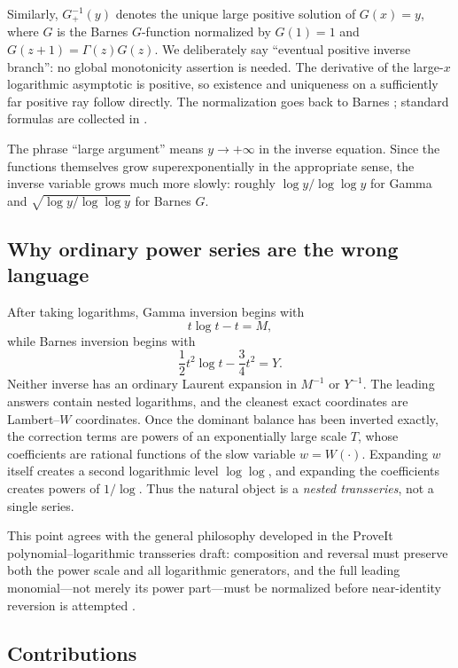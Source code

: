 \documentclass[11pt]{article}
\theoremstyle{definition}
\theoremstyle{remark}
\newcommand{\Barinv}{G_{+}^{-1}}
\begin{document}
Similarly, \(\Barinv(y)\) denotes the unique large positive solution of
\(G(x)=y\), where \(G\) is the Barnes \(G\)-function normalized by
\(G(1)=1\) and \(G(z+1)=\Gamma(z)G(z)\).  We deliberately say
``eventual positive inverse branch'': no global monotonicity assertion is needed.  The derivative of the large-\(x\) logarithmic asymptotic is positive, so existence and uniqueness on a sufficiently far positive ray follow directly.  The normalization goes back to Barnes \cite{Barnes1900}; standard formulas are collected in \cite{DLMF}.

The phrase ``large argument'' means \(y\to+\infty\) in the inverse equation.  Since the functions themselves grow superexponentially in the appropriate sense, the inverse variable grows much more slowly: roughly \(\log y/\log\log y\) for Gamma and \(\sqrt{\log y/\log\log y}\) for Barnes \(G\).

\subsection{Why ordinary power series are the wrong language}

After taking logarithms, Gamma inversion begins with
\[
  t\log t-t=M,
\]
while Barnes inversion begins with
\[
  \frac12t^2\log t-\frac34t^2=Y.
\]
Neither inverse has an ordinary Laurent expansion in \(M^{-1}\) or \(Y^{-1}\).  The leading answers contain nested logarithms, and the cleanest exact coordinates are Lambert--\(W\) coordinates.  Once the dominant balance has been inverted exactly, the correction terms are powers of an exponentially large scale \(T\), whose coefficients are rational functions of the slow variable \(w=W(\cdot)\).  Expanding \(w\) itself creates a second logarithmic level \(\log\log\), and expanding the coefficients creates powers of \(1/\log\).  Thus the natural object is a \emph{nested transseries}, not a single series.

This point agrees with the general philosophy developed in the ProveIt polynomial--logarithmic transseries draft: composition and reversal must preserve both the power scale and all logarithmic generators, and the full leading monomial---not merely its power part---must be normalized before near-identity reversion is attempted \cite{ProveItPLT,SalvyShackell,vanderHoeven}.

\subsection{Contributions}
\end{document}
